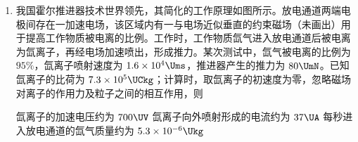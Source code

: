 \documentclass[\gkver]{gaokaozhenti}
\begin{document}
\begin{enumerate}
{D．根据牛顿第二定律和运动学关系得

$mg\sin\theta+f=ma$，$t=\frac{v_{0}}{a}$

故可求解沿斜面上滑的时间，D 正确。

故选 BD。
}

\item
我国霍尔推进器技术世界领先，其简化的工作原理如图所示。放电通道两端电极间存在一加速电场，该区域内有一与电场近似垂直的约束磁场（未画出）用于提高工作物质被电离的比例。工作时，工作物质氙气进入放电通道后被电离为氙离子，再经电场加速喷出，形成推力。某次测试中，氙气被电离的比例为 $95\%$，氙离子喷射速度为 $1.6\times10^{4}\Ums$，推进器产生的推力为 $80\UmN$。已知氙离子的比荷为 $7.3\times10^{5}\UCkg$；计算时，取氙离子的初速度为零，忽略磁场对离子的作用力及粒子之间的相互作用，则


{氙离子的加速电压约为 $700\UV$}
{氙离子向外喷射形成的电流约为 $37\UA$}
{每秒进入放电通道的氙气质量约为 $5.3\times10^{-6}\Ukg$}

\end{enumerate}
\end{document}
